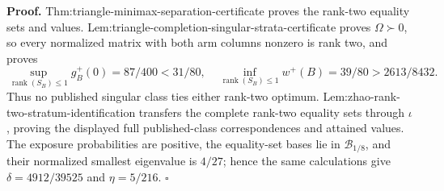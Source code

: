 \textbf{Proof.}
Thm:triangle-minimax-separation-certificate proves the rank-two equality sets and values.  Lem:triangle-completion-singular-strata-certificate proves \(\Omega\succ0\), so every normalized matrix with both arm columns nonzero is rank two, and proves
\[
\sup_{\operatorname{rank}(S_B)\le1}g_B^+(0)=87/400<31/80,
\quad
\inf_{\operatorname{rank}(S_B)\le1}w^+(B)=39/80>2613/8432.
\]
Thus no published singular class ties either rank-two optimum.  Lem:zhao-rank-two-stratum-identification transfers the complete rank-two equality sets through \(\iota\), proving the displayed full published-class correspondences and attained values.  The exposure probabilities are positive, the equality-set bases lie in \(\mathcal B_{1/8}\), and their normalized smallest eigenvalue is \(4/27\); hence the same calculations give \(\delta=4912/39525\) and \(\eta=5/216\). \(\square\)